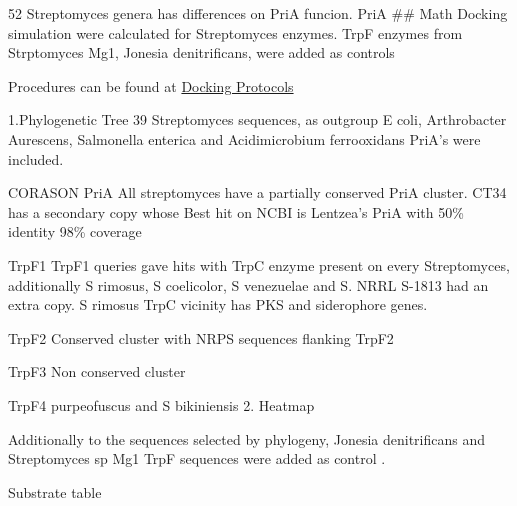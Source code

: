 \documentclass[12pt,twoside]{reedthesis}
\begin{document}
  52 Streptomyces genera has differences on PriA funcion. PriA \#\# Math
  Docking simulation were calculated for Streptomyces enzymes. TrpF
  enzymes from Strptomyces Mg1, Jonesia denitrificans, were added as
  controls
  
  Procedures can be found at
  \href{https://github.com/tripplab/Docking/wiki}{Docking Protocols}
  
  1.Phylogenetic Tree 39 Streptomyces sequences, as outgroup E coli,
  Arthrobacter Aurescens, Salmonella enterica and Acidimicrobium
  ferrooxidans PriA's were included.
  
  CORASON PriA All streptomyces have a partially conserved PriA cluster.
  CT34 has a secondary copy whose Best hit on NCBI is Lentzea's PriA with
  50\% identity 98\% coverage
  
  TrpF1 TrpF1 queries gave hits with TrpC enzyme present on every
  Streptomyces, additionally S rimosus, S coelicolor, S venezuelae and S.
  NRRL S-1813 had an extra copy. S rimosus TrpC vicinity has PKS and
  siderophore genes.
  
  TrpF2 Conserved cluster with NRPS sequences flanking TrpF2
  
  TrpF3 Non conserved cluster
  
  TrpF4 purpeofuscus and S bikiniensis 2. Heatmap
  
  Additionally to the sequences selected by phylogeny, Jonesia
  denitrificans and Streptomyces sp Mg1 TrpF sequences were added as
  control .
  
  Substrate table
  
  \begin{Shaded}
  \begin{Highlighting}[]
  \StringTok{ }\NormalTok{(}\NormalTok{, } \NormalTok{,}\NormalTok{)}
   \CharTok{\textbackslash{}\textbackslash{}}\NormalTok{,} \NormalTok{)}
  \end{Highlighting}
  \end{Shaded}
  
\end{document}
